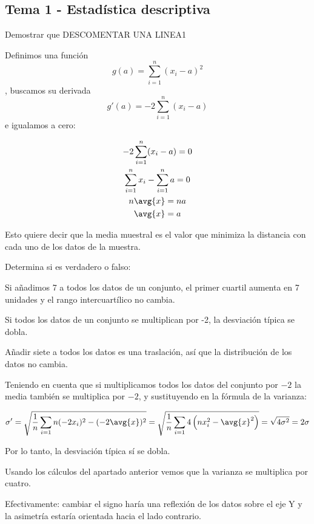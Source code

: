 \subsection{Tema 1 - Estadística descriptiva}

\begin{problem}[2] 

Demostrar que 
DESCOMENTAR UNA LINEA1

\solution

Definimos una función \[ g(a) = \sum_{i=1}^n(x_i-a)^2 \], buscamos su derivada \[ g'(a) = -2 \sum_{i=1}^n(x_i-a) \] e igualamos a cero:

\begin{gather*}
-2 \sum_{i=1}^n(x_i-a) = 0 \\
\sum_{i=1}^n x_i - \sum_{i=1}^n a = 0 \\
n \avg{x} = n a \\
\avg{x} = a 
\end{gather*}

Esto quiere decir que la media muestral es el valor que minimiza la distancia con cada uno de los datos de la muestra.
\end{problem}

\begin{problem}[5]Determina si es verdadero o falso:

\ppart Si añadimos 7 a todos los datos de un conjunto, el primer cuartil aumenta en 7 unidades y el rango intercuartílico no cambia.

\ppart Si todos los datos de un conjunto se multiplican por -2, la desviación típica se dobla.
\solution 

\spart Añadir siete a todos los datos es una traslación, así que la distribución de los datos no cambia.

\spart Teniendo en cuenta que si multiplicamos todos los datos del conjunto por $-2$ la media también se multiplica por $-2$, y sustituyendo en la fórmula de la varianza:

\[ \sigma' = \sqrt{\frac{1}{n} \sum_{i=1}n (-2x_i)^2 - (-2\avg{x})^2} = \sqrt{\frac{1}{n} \sum_{i=1}4\left(n x_i^2 - \avg{x}^2\right)} = \sqrt{4\sigma^2} = 2\sigma \]

Por lo tanto, la desviación típica sí se dobla.

\spart Usando los cálculos del apartado anterior vemos que la varianza se multiplica por cuatro.

\spart Efectivamente: cambiar el signo haría una reflexión de los datos sobre el eje Y y la asimetría estaría orientada hacia el lado contrario. 

\end{problem}

